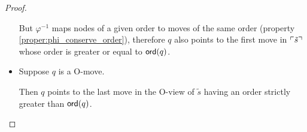 \begin{proof}
\begin{itemize}
But $\varphi^{-1}$ maps nodes of a given order to moves of the same order (property \ref{proper:phi_conserve_order}),
therefore $q$ also points to the first move in $\ulcorner \tilde{s} \urcorner$ whose
order is greater or equal to ${\sf ord}(q)$.


\item Suppose $q$ is a O-move.

Then $q$ points to the last move in the O-view of $\tilde{s}$ having an order strictly greater than ${\sf ord}(q)$.




\end{itemize}

\end{proof}
